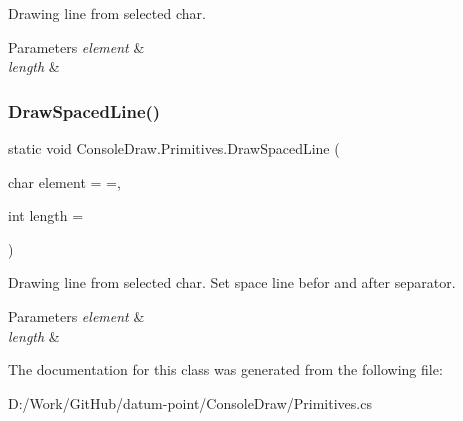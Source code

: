 Drawing line from selected char. 


\begin{DoxyParams}{Parameters}
{\em element} & \\
\hline
{\em length} & \\
\hline
\end{DoxyParams}
\mbox{\label{class_console_draw_1_1_primitives_a56f4fc0b28e3e0182208dccaf6944fdb}} 
\subsubsection{\texorpdfstring{Draw\+Spaced\+Line()}{DrawSpacedLine()}}
{\footnotesize\ttfamily static void Console\+Draw.\+Primitives.\+Draw\+Spaced\+Line (\begin{DoxyParamCaption}\item[{char}]{element = {\ttfamily \textquotesingle{}=\textquotesingle{}},  }\item[{int}]{length = {} }\end{DoxyParamCaption})\hspace{0.3cm}{\ttfamily [static]}}



Drawing line from selected char. Set space line befor and after separator. 


\begin{DoxyParams}{Parameters}
{\em element} & \\
\hline
{\em length} & \\
\hline
\end{DoxyParams}


The documentation for this class was generated from the following file\+:\begin{DoxyCompactItemize}
\item 
D\+:/\+Work/\+Git\+Hub/datum-\/point/\+Console\+Draw/Primitives.\+cs\end{DoxyCompactItemize}
